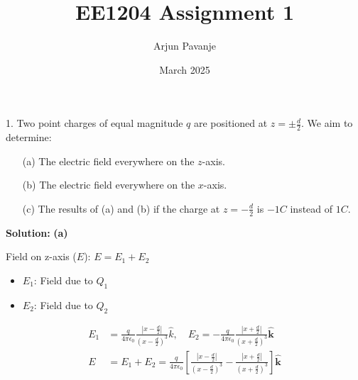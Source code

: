 \documentclass{article}
\title{EE1204 Assignment 1}
\author{Arjun Pavanje}
\date{March 2025}
\begin{document}
\maketitle

1. Two point charges of equal magnitude $q$ are positioned at $z = \pm \frac{d}{2}$. We aim to determine:
\begin{enumerate}
    \item[(a)] The electric field everywhere on the $z$-axis.
    \item[(b)] The electric field everywhere on the $x$-axis.
    \item[(c)] The results of (a) and (b) if the charge at $z = -\frac{d}{2}$ is $-1C$ instead of $1C$.
\end{enumerate}

\textbf{Solution:}\newline
\textbf{(a)} 
\begin{figure}[!ht]
\centering
{}%

\label{fig:my_label}
\end{figure}
Field on z-axis ($E$): $E = E_1 + E_2$

\begin{itemize}
    \item $E_1$: Field due to $Q_1$
    \item $E_2$: Field due to $Q_2$
\end{itemize}

\begin{align*}
E_1 &= \frac{q}{4 \pi \epsilon_0} \frac{|x-\frac{d}{2}| }{(x - \frac{d}{2})^3} \hat{k}, \quad
E_2 = -\frac{q}{4 \pi \epsilon_0} \frac{|x + \frac{d}{2}|}{(x + \frac{d}{2})^3} \mathbf{\hat{k}} \\
E &= E_1 + E_2 = \frac{q}{4 \pi \epsilon_0} 
\left[ 
\frac{|x - \frac{d}{2}|}{(x - \frac{d}{2})^3} - \frac{|x + \frac{d}{2}|}{(x + \frac{d}{2})^3}
\right]\mathbf{\hat{k}}
\end{align*}
\end{document}
